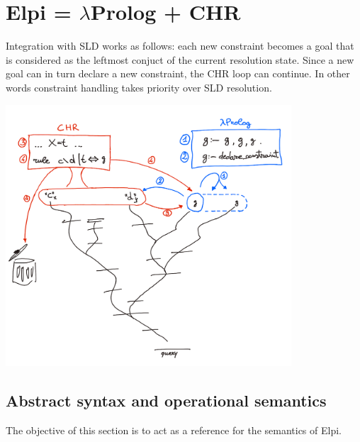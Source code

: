 \documentclass[a4paper, 11pt]{book}
\begin{document}
\section{Elpi = $\lambda$Prolog + CHR}\label{sec:elpiLP+CHR}

Integration with SLD works as follows: each new constraint becomes
a goal that is considered as the leftmost conjuct of the current
resolution state. Since a new goal can in turn declare a new constraint,
the CHR loop can continue. In other words constraint handling takes
priority over SLD resolution.


  \includegraphics[width=0.8\textwidth]{chr.png}


\subsection{Abstract syntax and operational semantics}\label{sec:sem}

The objective of this section is to act as a reference for
the semantics of Elpi.
\end{document}

